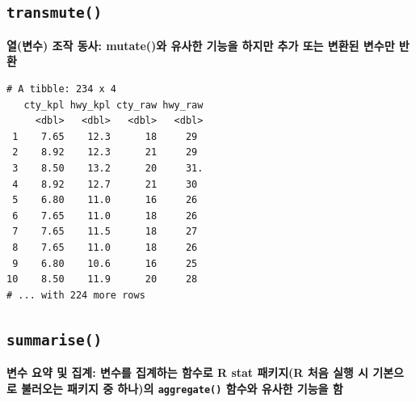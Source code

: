 \documentclass[
  11pt,
]{krantz}
\makeatletter
\newenvironment{Shaded}{\begin{snugshade}}{\end{snugshade}}
\newcommand{\DataTypeTok}[1]{\textcolor[rgb]{0.27,0.27,0.27}{#1}}
\newcommand{\KeywordTok}[1]{\textcolor[rgb]{0.27,0.27,0.27}{\textbf{#1}}}
\newcommand{\NormalTok}[1]{#1}
\newcommand{\OperatorTok}[1]{\textcolor[rgb]{0.43,0.43,0.43}{\textbf{#1}}}
\newcommand{\StringTok}[1]{\textcolor[rgb]{0.5,0.5,0.5}{#1}}
\newenvironment{kframe}{%
\medskip{}
\setlength{\fboxsep}{.8em}
 \def\at@end@of@kframe{}%
 \ifinner\ifhmode%
  \def\at@end@of@kframe{\end{minipage}}%
  \begin{minipage}{\columnwidth}%
 \fi\fi%
 \def\FrameCommand##1{\hskip\@totalleftmargin \hskip-\fboxsep
 \colorbox{shadecolor}{##1}\hskip-\fboxsep
     \hskip-\linewidth \hskip-\@totalleftmargin \hskip\columnwidth}%
 \MakeFramed {\advance\hsize-\width
   \@totalleftmargin\z@ \linewidth\hsize
   \@setminipage}}%
 {\par\unskip\endMakeFramed%
 \at@end@of@kframe}
\renewenvironment{quote}{\begin{kframe}}{\end{kframe}}
\makeatother
\begin{document}
\normalsize

\hypertarget{dplyr-transmute}{%
\subsection{\texorpdfstring{\texttt{transmute()}}{transmute()}}\label{dplyr-transmute}}

\begin{quote}
\textbf{열(변수) 조작 동사: mutate()와 유사한 기능을 하지만 추가 또는 변환된 변수만 반환}
\end{quote}

\footnotesize

\begin{Shaded}
\end{Shaded}

\begin{verbatim}
# A tibble: 234 x 4
   cty_kpl hwy_kpl cty_raw hwy_raw
     <dbl>   <dbl>   <dbl>   <dbl>
 1    7.65    12.3      18     29 
 2    8.92    12.3      21     29 
 3    8.50    13.2      20     31.
 4    8.92    12.7      21     30 
 5    6.80    11.0      16     26 
 6    7.65    11.0      18     26 
 7    7.65    11.5      18     27 
 8    7.65    11.0      18     26 
 9    6.80    10.6      16     25 
10    8.50    11.9      20     28 
# ... with 224 more rows
\end{verbatim}

\normalsize

\hypertarget{dplyr-summarise}{%
\subsection{\texorpdfstring{\texttt{summarise()}}{summarise()}}\label{dplyr-summarise}}

\begin{quote}
\textbf{변수 요약 및 집계: 변수를 집계하는 함수로 R stat 패키지(R 처음 실행 시 기본으로 불러오는 패키지 중 하나)의 \texttt{aggregate()} 함수와 유사한 기능을 함}
\end{quote}
\end{document}
